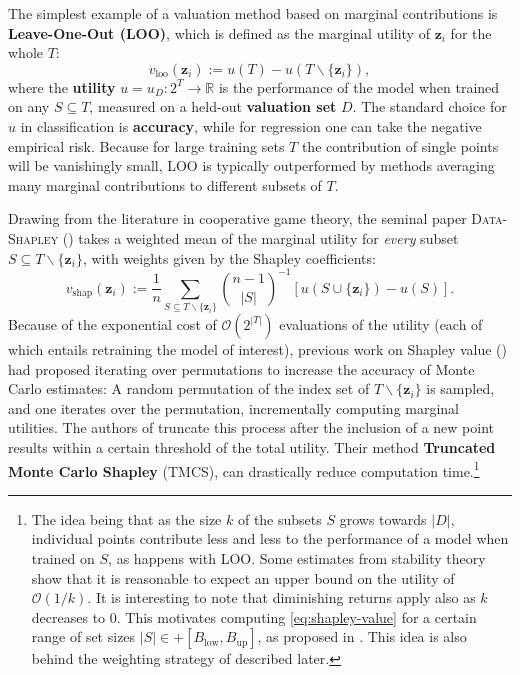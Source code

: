 \documentclass[10pt]{article}
\newcommand{\assign}{:=}
\newcommand{\tmdfn}[1]{\textbf{#1}}
\newcommand{\tmem}[1]{{\em #1\/}}
\newcommand{\tmmathbf}[1]{\ensuremath{\boldsymbol{#1}}}
\newcommand{\tmname}[1]{\textsc{#1}}
\newcommand{\tmop}[1]{\ensuremath{\operatorname{#1}}}
\begin{document}
The simplest example of a valuation method based on marginal contributions is
{\tmdfn{Leave-One-Out (LOO)}}, which is defined as the marginal utility of
$\tmmathbf{z}_i$ for the whole $T$:
\begin{equation}
  v_{\mathrm{loo}} (\tmmathbf{z}_i) \assign u (T) - u
  (T\backslash\{\tmmathbf{z}_i \}), \label{eq:loo}
\end{equation}
where the {\tmdfn{utility}} $u = u_D : 2^T \rightarrow \mathbb{R}$ is the
performance of the model when trained on any $S \subseteq T$, measured on a
held-out {\tmdfn{valuation set}} $D$. The standard choice for $u$ in
classification is {\tmdfn{accuracy}}, while for regression one can take the
negative empirical risk. Because for large training sets $T$ the contribution
of single points will be vanishingly small, LOO is typically outperformed by
methods averaging many marginal contributions to different subsets of $T$.

Drawing from the literature in cooperative game theory, the seminal paper
{\tmname{Data-Shapley}} ({\cite{ghorbani_data_2019}}) takes a weighted mean
of the marginal utility for {\tmem{every}} subset $S \subseteq T\backslash \{
\tmmathbf{z}_i \}$, with weights given by the Shapley coefficients:
\begin{equation}
  v_{\tmop{shap}} (\tmmathbf{z}_i) \assign \frac{1}{n}  \sum_{S \subseteq
  T\backslash \{\tmmathbf{z}_i \}} \binom{n - 1}{| S |}^{- 1}  [u (S \cup
  \{\tmmathbf{z}_i \}) - u (S)] . \label{eq:shapley-value}
\end{equation}
Because of the exponential cost of $\mathcal{O} (2^{| T |})$ evaluations of
the utility (each of which entails retraining the model of interest), previous
work on Shapley value ({\cite{castro_polynomial_2009}}) had proposed
iterating over permutations to increase the accuracy of Monte Carlo estimates:
A random permutation of the index set of $T\backslash \{ \tmmathbf{z}_i \}$ is
sampled, and one iterates over the permutation, incrementally computing
marginal utilities. The authors of {\cite{ghorbani_data_2019}} truncate this
process after the inclusion of a new point results within a certain threshold
of the total utility. Their method {\tmdfn{Truncated Monte Carlo Shapley}}
(TMCS), can drastically reduce computation time.\footnote{The idea being that
as the size $k$ of the subsets $S$ grows towards $|D|$, individual points
contribute less and less to the performance of a model when trained on $S$, as
happens with LOO. Some estimates from stability theory show that it is
reasonable to expect an upper bound on the utility of $\mathcal{O} (1 / k)$.
It is interesting to note that diminishing returns apply also as $k$ decreases
to 0. This motivates computing \eqref{eq:shapley-value} for a certain range of
set sizes $|S| \in + [B_{\tmop{low}}, B_{\tmop{up}}]$, as proposed in
{\cite{watson_accelerated_2023}}. This idea is also behind the weighting
strategy of {\cite{kwon_beta_2022}} described later.}
\end{document}
